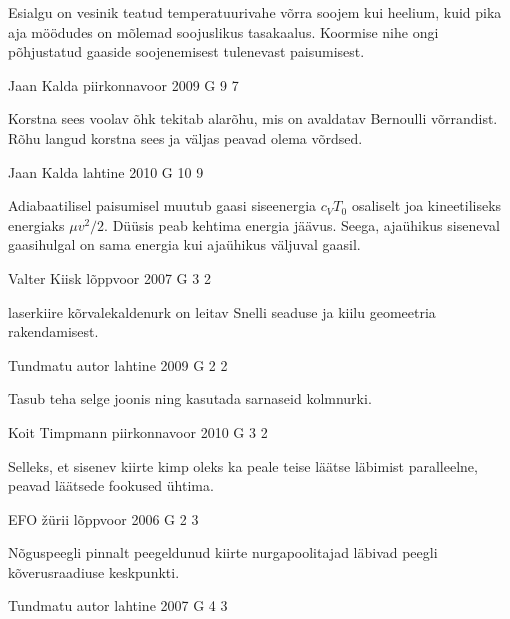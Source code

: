 \documentclass[11pt]{article}
\begin{document}
{{\ifHint
Esialgu on vesinik teatud temperatuurivahe võrra soojem kui heelium, kuid pika aja möödudes on mõlemad soojuslikus tasakaalus. Koormise nihe ongi põhjustatud gaaside soojenemisest tulenevast paisumisest.
\fi
}

{Jaan Kalda} %
{piirkonnavoor} %
{2009} %
{G 9} %
{7} %
{

\ifHint
Korstna sees voolav õhk tekitab alarõhu, mis on avaldatav Bernoulli võrrandist. Rõhu langud korstna sees ja väljas peavad olema võrdsed.
\fi
}

{Jaan Kalda} %
{lahtine} %
{2010} %
{G 10} %
{9} %
{

\ifHint
Adiabaatilisel paisumisel muutub gaasi siseenergia $c_VT_0$ osaliselt joa kineetiliseks energiaks $\mu v^2/2$. Düüsis peab kehtima energia jäävus. Seega, ajaühikus siseneval gaasihulgal on sama energia kui ajaühikus väljuval gaasil.
\fi
}

{Valter Kiisk} %
{lõppvoor} %
{2007} %
{G 3} %
{2} %
{

\ifHint
laserkiire kõrvalekaldenurk on leitav Snelli seaduse ja kiilu geomeetria rakendamisest.
\fi
}

{Tundmatu autor} %
{lahtine} %
{2009} %
{G 2} %
{2} %
{

\ifHint
Tasub teha selge joonis ning kasutada sarnaseid kolmnurki.
\fi
}

{Koit Timpmann} %
{piirkonnavoor} %
{2010} %
{G 3} %
{2} %
{

\ifHint
Selleks, et sisenev kiirte kimp oleks ka peale teise läätse läbimist paralleelne, peavad läätsede fookused ühtima.
\fi
}

{EFO žürii} %
{lõppvoor} %
{2006} %
{G 2} %
{3} %
{

\ifHint
Nõguspeegli pinnalt peegeldunud kiirte nurgapoolitajad läbivad peegli kõverusraadiuse keskpunkti.
\fi
}

{Tundmatu autor} %
{lahtine} %
{2007} %
{G 4} %
{3} %
{

}}
\end{document}
